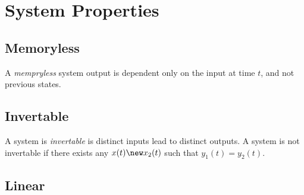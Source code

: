 \section{System Properties}

\subsection{Memoryless}
A \emph{mempryless} system output is dependent
only on the input at time $t$, and not previous states.

\subsection{Invertable}
A system is \emph{invertable} is distinct
inputs lead to distinct outputs. A system is not
invertable if there exists any $x(t) \new x_2(t)$ such
that $y_1(t) = y_2(t)$.

\subsection{Linear}

